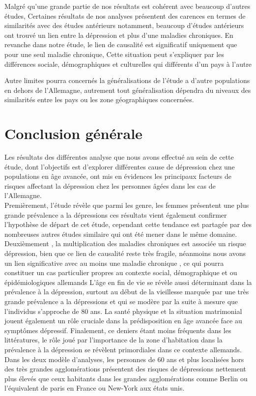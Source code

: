 \documentclass[a4paper]{article}
\begin{document}
Malgré qu’une grande partie de nos résultats est cohérent avec beaucoup d’autres études, Certaines résultats de nos analyses présentent des carences en termes de similarités avec des études  antérieurs notamment, beaucoup d’études antérieurs ont trouvé un lien entre la dépression et plus d’une maladies chroniques. En revanche dans notre étude, le lien de causalité est significatif uniquement que pour une seul maladie chronique, Cette situation peut s’expliquer par les différences sociale, démographiques et culturelles qui différents d’un pays à l’autre

Autre limites pourra concernés la généralisations de l’étude a d’autre populations en dehors de l’Allemagne, autrement tout généralisation dépendra du niveaux des similarités entre les pays ou les zone géographiques concernées.





\section{Conclusion générale} 
Les résultats des différentes analyse que nous avons effectué au sein de cette étude, dont l’objectifs est d’explorer différentes  cause de dépression chez une populations en âge avancée, ont mis en évidences les principaux facteurs  de risques affectant la dépression  chez les personnes âgées dans les cas de l’Allemagne.\\

Premièrement, l’étude révèle que parmi les genre, les femmes présentent une plus grande prévalence a la dépressions ces résultats vient également confirmer l’hypothèse de départ de cet étude, cependant cette tendance est partagée par des nombreuses autres études similaire qui ont été mener dans le même domaine.
Deuxièmement , la multiplication des maladies chroniques est associée un risque dépression, bien que ce lien de causalité reste très fragile, néanmoins nous avons un lien significative avec au moins une maladie chronique , ce qui pourra constituer un cas particulier propres au contexte social, démographique et ou épidémiologiques allemands
L’âge en fin de vie se révèle aussi déterminant dans la prévalence à la dépression, surtout au début de la vieillesse marquée par une très grande prévalence a la dépressions et qui se modère par la suite à mesure que l’individus s’approche de 80 ans.
La santé physique et la situation matrimonial jouent également un rôle cruciale dans la prédisposition en âge avancée face au symptômes dépressif.
Finalement, ce deniers étant moins fréquents dans les littératures, le rôle joué par l’importance de la zone d’habitation dans la prévalence à la dépression se révèlent primordiales dans ce contexte allemands. Dans les deux modèle d’analyses, les personnes de 60 ans et plus localisées hors des très grandes agglomérations présentent des risques de dépressions nettement plus élevés que ceux habitants dans les grandes agglomérations comme Berlin ou l’équivalent de paris en France ou New-York aux états unis.\\
\end{document}
